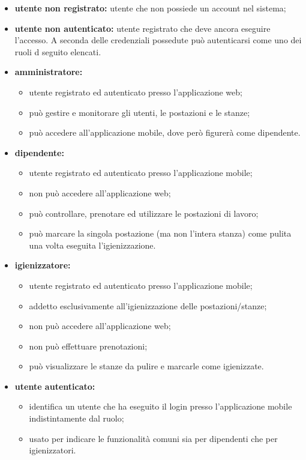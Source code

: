 
\begin{itemize}
    \item \textbf{utente non registrato:} utente che non possiede un account nel sistema;
    \item \textbf{utente non autenticato:} utente registrato che deve ancora eseguire l'accesso. A seconda delle credenziali possedute può autenticarsi come uno dei ruoli d seguito elencati.

    \item \textbf{amministratore:}
    \begin{itemize}
        \item utente registrato ed autenticato presso l'applicazione web; 
        \item pu\`{o} gestire e monitorare gli utenti, le postazioni e le stanze;
        \item può accedere all'applicazione mobile, dove però figurerà come dipendente.
    \end{itemize}

    \item \textbf{dipendente:}
    \begin{itemize}
        \item utente registrato ed autenticato presso l'applicazione mobile; 
        \item non può accedere all'applicazione web;
        \item può controllare, prenotare ed utilizzare le postazioni di lavoro;
        \item può marcare la singola postazione (ma non l'intera stanza) come pulita una volta eseguita l'igienizzazione.
    \end{itemize}

    \item \textbf{igienizzatore:}
    \begin{itemize}
        \item utente registrato ed autenticato presso l'applicazione mobile;
        \item addetto esclusivamente all'igienizzazione delle postazioni/stanze; 
        \item non può accedere all'applicazione web;
        \item non può effettuare prenotazioni;
        \item può visualizzare le stanze da pulire e marcarle come igienizzate.
    \end{itemize} 
   
    \item \textbf{utente autenticato:}
    \begin{itemize}
        \item identifica un utente che ha eseguito il login presso l'applicazione mobile indistintamente dal ruolo;
        \item usato per indicare le funzionalità comuni sia per dipendenti che per igienizzatori.
    \end{itemize}
\end{itemize}
